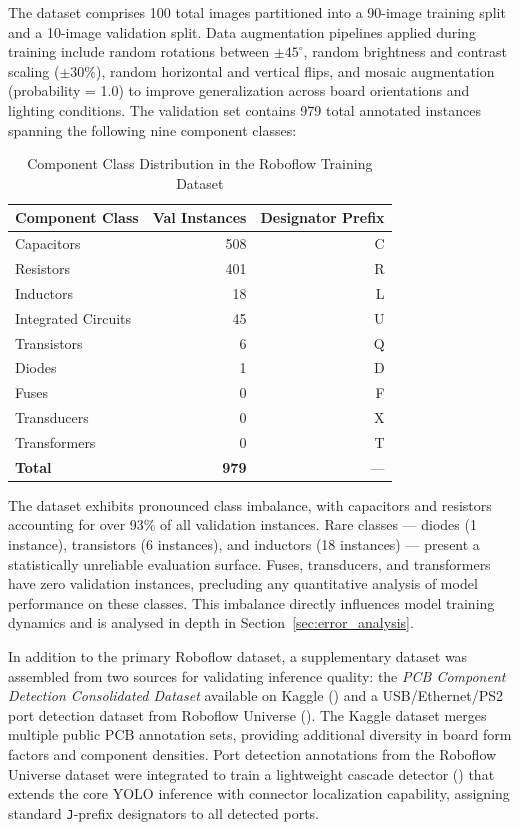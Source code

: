 \documentclass[12pt,a4paper]{report}
\begin{document}
The dataset comprises 100 total images partitioned into a 90-image training split and a 10-image validation split. Data augmentation pipelines applied during training include random rotations between $\pm 45^{\circ}$, random brightness and contrast scaling ($\pm 30\%$), random horizontal and vertical flips, and mosaic augmentation (probability = 1.0) to improve generalization across board orientations and lighting conditions. The validation set contains 979 total annotated instances spanning the following nine component classes:

\begin{table}[H]
  \centering
  \caption{Component Class Distribution in the Roboflow Training Dataset}
  \label{tab:class_distribution}
  \begin{tabular}{@{}lrr@{}}
    \toprule
    \textbf{Component Class} & \textbf{Val Instances} & \textbf{Designator Prefix} \\
    \midrule
    Capacitors          & 508 & C \\
    Resistors           & 401 & R \\
    Inductors           &  18 & L \\
    Integrated Circuits &  45 & U \\
    Transistors         &   6 & Q \\
    Diodes              &   1 & D \\
    Fuses               &   0 & F \\
    Transducers         &   0 & X \\
    Transformers        &   0 & T \\
    \midrule
    \textbf{Total}      & \textbf{979} & --- \\
    \bottomrule
  \end{tabular}
\end{table}

The dataset exhibits pronounced class imbalance, with capacitors and resistors accounting for over 93\% of all validation instances. Rare classes --- diodes (1 instance), transistors (6 instances), and inductors (18 instances) --- present a statistically unreliable evaluation surface. Fuses, transducers, and transformers have zero validation instances, precluding any quantitative analysis of model performance on these classes. This imbalance directly influences model training dynamics and is analysed in depth in Section~\ref{sec:error_analysis}.

In addition to the primary Roboflow dataset, a supplementary dataset was assembled from two sources for validating inference quality: the \textit{PCB Component Detection Consolidated Dataset} available on Kaggle () and a USB/Ethernet/PS2 port detection dataset from Roboflow Universe (). The Kaggle dataset merges multiple public PCB annotation sets, providing additional diversity in board form factors and component densities. Port detection annotations from the Roboflow Universe dataset were integrated to train a lightweight cascade detector () that extends the core YOLO inference with connector localization capability, assigning standard \texttt{J}-prefix designators to all detected ports.
\end{document}
